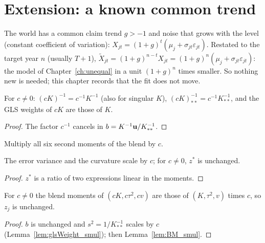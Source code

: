 \chapter{Extension: a known common trend}\label{ch:trend}

The world has a common claim trend $g > -1$ and noise that grows with the
level (constant coefficient of variation):
$X_{jt} = (1+g)^t(\mu_j + \sigma_{jt}\varepsilon_{jt})$. Restated to the
target year $n$ (usually $T+1$),
$\tilde X_{jt} = (1+g)^{n-t}X_{jt} = (1+g)^n(\mu_j + \sigma_{jt}\varepsilon_{jt})$:
the model of Chapter~\ref{ch:unequal} in a unit $(1+g)^n$ times smaller.
So nothing new is needed; this chapter records that the fit does not move.

\begin{lemma}[Scaling $K$]\label{lem:glsWeight_smul}
  \leanok
  For $c \ne 0$: $(cK)^{-1} = c^{-1}K^{-1}$ (also for singular $K$),
  $(cK)^{-1}_{**} = c^{-1}K^{-1}_{**}$, and the GLS weights of $cK$ are those of $K$.
\end{lemma}
\begin{proof}
  \leanok
  The factor $c^{-1}$ cancels in $b = K^{-1}\mathbf{u}/K^{-1}_{**}$.
\end{proof}

\begin{definition}\label{def:BM_smul}
  \leanok
  Multiply all six second moments of the blend by $c$.
\end{definition}

\begin{lemma}\label{lem:BM_smul}
  \leanok
  The error variance and the curvature scale by $c$; for $c \ne 0$, $z^\ast$ is unchanged.
\end{lemma}
\begin{proof}
  \leanok
  $z^\ast$ is a ratio of two expressions linear in the moments.
\end{proof}

\begin{lemma}\label{lem:Core_moments_smul}
  \leanok
  For $c \ne 0$ the blend moments of $(cK, c\tau^2, cv)$ are those of
  $(K, \tau^2, v)$ times $c$, so $z_j$ is unchanged.
\end{lemma}
\begin{proof}
  \leanok
  $b$ is unchanged and $s^2 = 1/K^{-1}_{**}$ scales by $c$
  (Lemma~\ref{lem:glsWeight_smul}); then Lemma~\ref{lem:BM_smul}.
\end{proof}

